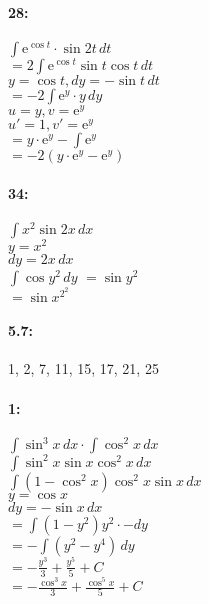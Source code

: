 \documentclass[12pt]{article}
\newcommand{\me}{\mathrm{e}}
\begin{document}
    \paragraph*{28:\\}
    $\int \! \me^{\cos{t}} \cdot \sin{2t} \, dt$\\
    $= 2\int\!\me^{\cos{t}}\sin{t}\cos{t} \, dt$\\
    $y = \cos{t}, dy = -\sin{t} \, dt$\\
    $= -2\int\!\me^{y}\cdot y \, dy$\\
    $u = y, v = \me^{y}$\\
    $u' = 1, v' = \me^{y}$\\
    $= y \cdot \me^{y} - \int\! \me^{y}$\\
    $= -2(y\cdot\me^{y}-\me^{y})$\\

    \paragraph*{34:\\}
    $\int\!x^{2} \sin{2x} \, dx$\\
    $y = x^2$\\
    $dy = 2x \, dx$\\
    $\int \! \cos{y^{2}}\, dy$
    $= \sin{y^{2}}$\\
    $= \sin{x^{2^{2}}}$\\

    

    \paragraph*{5.7:} 1, 2, 7, 11, 15, 17, 21, 25
    \paragraph*{1:\\}
    $\int\!\sin^{3}x\,dx\cdot\int\!\cos^{2}x\,dx$\\
    $\int\! \sin^2 x \sin x \cos^2 x \, dx$\\
    $\int \! (1-\cos^2 x) \cos^2 x \sin x \, dx$\\
    $y = \cos{x}$\\
    $dy = -\sin{x} \, dx$\\
    $=\int\!(1-y^2) y^2 \cdot -dy$\\
    $=-\int(y^2 - y^4)\,dy$\\
    $=-\frac{y^3}{3} + \frac{y^5}{5} + C$\\
    $=-\frac{\cos^3 x}{3} + \frac{\cos^5 x}{5} + C$\\
\end{document}
